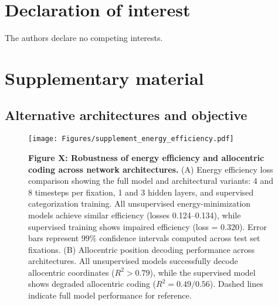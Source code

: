 \documentclass[10pt,letterpaper]{article}
\begin{document}
\section{Declaration of interest}
The authors declare no competing interests.

\newpage


%




\newpage
\newpage
\section{Supplementary material}
\subsection{Alternative architectures and objective}


\begin{figure*}[ht!]
\begin{center}
\texttt{[image: Figures/supplement\_energy\_efficiency.pdf]}
\end{center}
\caption{\textbf{Figure X: Robustness of energy efficiency and allocentric coding across network architectures.} 
(A) Energy efficiency loss comparison showing the full model and architectural variants: 4 and 8 timesteps per fixation, 1 and 3 hidden layers, and supervised categorization training. 
All unsupervised energy-minimization models achieve similar efficiency (losses 0.124--0.134), while supervised training shows impaired efficiency (loss = 0.320). 
Error bars represent 99\% confidence intervals computed across test set fixations. 
(B) Allocentric position decoding performance across architectures. 
All unsupervised models successfully decode allocentric coordinates ($R^2 > 0.79$), while the supervised model shows degraded allocentric coding ($R^2 = 0.49/0.56$). 
Dashed lines indicate full model performance for reference.
} 
\label{figure4}
\end{figure*}
\end{document}
